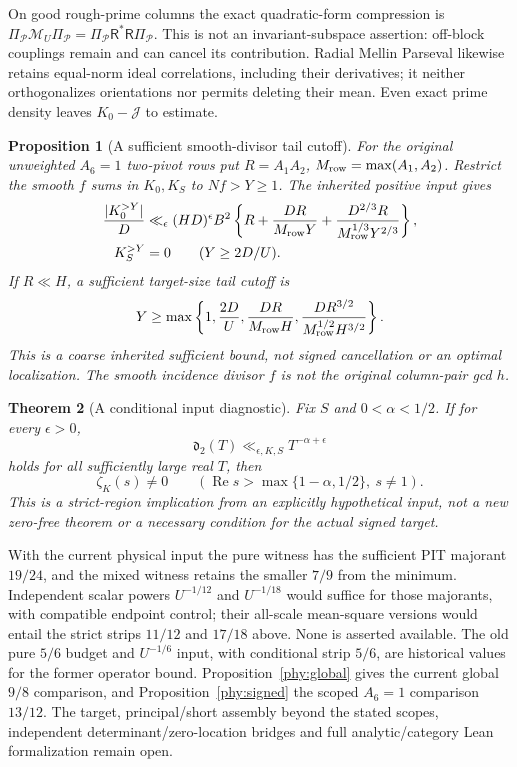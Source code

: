 \documentclass[11pt]{article}
\newtheorem{theorem}{Theorem}[section]
\newtheorem{proposition}[theorem]{Proposition}
\theoremstyle{definition}\newtheorem{definition}[theorem]{Definition}
\theoremstyle{remark}\newtheorem{remark}[theorem]{Remark}
\begin{document}
On good rough-prime columns the exact quadratic-form compression is
$\Pi_{\mathcal P}\mathcal M_U\Pi_{\mathcal P}
 =\Pi_{\mathcal P}\mathsf R^*\mathsf R\Pi_{\mathcal P}$.
This is not an invariant-subspace assertion: off-block couplings remain
and can cancel its contribution. Radial Mellin Parseval likewise
retains equal-norm ideal correlations, including their derivatives;
it neither orthogonalizes orientations nor permits deleting their mean.
Even exact prime density leaves $K_0-\mathcal J$ to estimate.

\begin{proposition}[A sufficient smooth-divisor tail cutoff]\label{cmr:tail}
For the original unweighted $A_6=1$ two-pivot rows put
$R=A_1A_2$, $M_{\rm row}=\max(A_1,A_2)$.
Restrict the smooth $f$ sums in $K_0,K_S$ to $Nf>Y\ge1$.
The inherited positive input gives
\begin{equation}\label{cmr:tailbound}
 \begin{aligned}
 \frac{|K_0^{>Y}|}D&\ll_\epsilon(HD)^\epsilon B^2
 \left\{R+\frac{DR}{M_{\rm row}Y}
       +\frac{D^{2/3}R}{M_{\rm row}^{1/3}Y^{2/3}}\right\},\\
 K_S^{>Y}&=0\qquad(Y\ge2D/U).
 \end{aligned}
\end{equation}
If $R\ll H$, a sufficient target-size tail cutoff is
\[
 Y\ge\max\left\{1,\frac{2D}U,\frac{DR}{M_{\rm row}H},
       \frac{DR^{3/2}}{M_{\rm row}^{1/2}H^{3/2}}\right\}.
\]
This is a coarse inherited sufficient bound, not signed cancellation
or an optimal localization. The smooth incidence divisor $f$ is not
the original column-pair gcd $h$.
\end{proposition}

\begin{theorem}[A conditional input diagnostic]\label{cmr:conditional-strip}
Fix $S$ and $0<\alpha<1/2$. If for every $\epsilon>0$,
\[
 \mathfrak d_2(T)\ll_{\epsilon,K,S}T^{-\alpha+\epsilon}
\]
holds for all sufficiently large real $T$, then
\[
 \zeta_K(s)\ne0\qquad
   (\operatorname{Re}s>\max\{1-\alpha,1/2\},\ s\ne1).
\]
This is a strict-region implication from an explicitly hypothetical
input, not a new zero-free theorem or a necessary condition for the
actual signed target.
\end{theorem}

With the current physical input the pure witness has the sufficient
PIT majorant $19/24$, and the mixed witness retains the smaller $7/9$
from the minimum. Independent scalar powers $U^{-1/12}$ and
$U^{-1/18}$ would suffice for those majorants, with compatible endpoint
control; their all-scale mean-square versions would entail the strict
strips $11/12$ and $17/18$ above. None is asserted available.
The old pure $5/6$ budget and $U^{-1/6}$ input, with conditional strip
$5/6$, are historical values for the former operator bound.
Proposition~\ref{phy:global} gives the current global $9/8$ comparison,
and Proposition~\ref{phy:signed} the scoped $A_6=1$ comparison $13/12$.
The target, principal/short assembly beyond the stated scopes,
independent determinant/zero-location bridges and full analytic/category
Lean formalization remain open.
\end{document}
